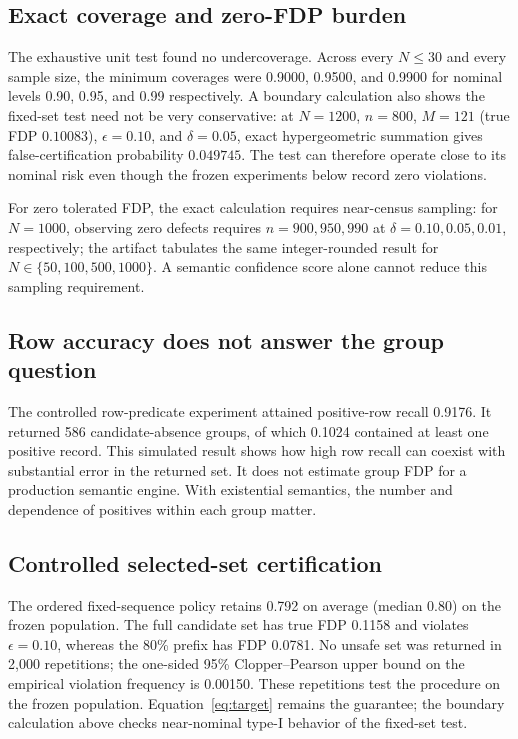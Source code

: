 \documentclass[runningheads]{llncs}
\begin{document}
\subsection{Exact coverage and zero-FDP burden}
The exhaustive unit test found no undercoverage. Across every $N\le30$ and every sample size, the minimum coverages were 0.9000, 0.9500, and 0.9900 for nominal levels 0.90, 0.95, and 0.99 respectively. A boundary calculation also shows the fixed-set test need not be very conservative: at $N=1200$, $n=800$, $M=121$ (true FDP $0.10083$), $\epsilon=0.10$, and $\delta=0.05$, exact hypergeometric summation gives false-certification probability $0.049745$. The test can therefore operate close to its nominal risk even though the frozen experiments below record zero violations.

For zero tolerated FDP, the exact calculation requires near-census sampling: for $N=1000$, observing zero defects requires $n=900,950,990$ at $\delta=0.10,0.05,0.01$, respectively; the artifact tabulates the same integer-rounded result for $N\in\{50,100,500,1000\}$. A semantic confidence score alone cannot reduce this sampling requirement.

\subsection{Row accuracy does not answer the group question}
The controlled row-predicate experiment attained positive-row recall 0.9176. It returned 586 candidate-absence groups, of which 0.1024 contained at least one positive record. This simulated result shows how high row recall can coexist with substantial error in the returned set. It does not estimate group FDP for a production semantic engine. With existential semantics, the number and dependence of positives within each group matter.

\subsection{Controlled selected-set certification}
The ordered fixed-sequence policy retains 0.792 on average (median 0.80) on the frozen population. The full candidate set has true FDP 0.1158 and violates $\epsilon=0.10$, whereas the 80\% prefix has FDP 0.0781. No unsafe set was returned in 2,000 repetitions; the one-sided 95\% Clopper--Pearson upper bound on the empirical violation frequency is 0.00150. These repetitions test the procedure on the frozen population. Equation~\eqref{eq:target} remains the guarantee; the boundary calculation above checks near-nominal type-I behavior of the fixed-set test.
\end{document}
